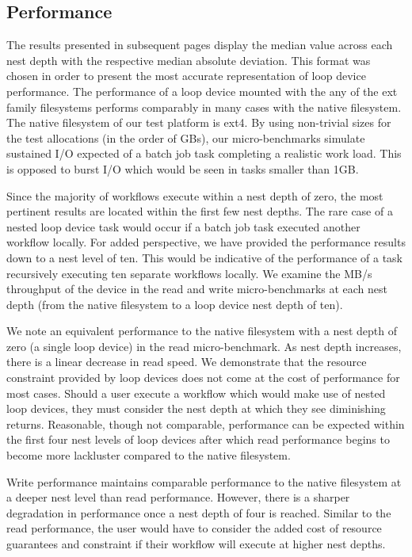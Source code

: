 \documentclass[conference]{IEEEtran}
\begin{document}
\subsection{Performance}
The results presented in subsequent pages display the median value across each nest depth with the respective median absolute deviation. This format was chosen in order to present the most accurate representation of loop device performance. The performance of a loop device mounted with the any of the ext family filesystems performs comparably in many cases with the native filesystem. The native filesystem of our test platform is ext4. By using non-trivial sizes for the test allocations (in the order of GBs), our micro-benchmarks simulate sustained I/O expected of a batch job task completing a realistic work load. This is opposed to burst I/O which would be seen in tasks smaller than 1GB. 

Since the majority of workflows execute within a nest depth of zero, the most pertinent results are located within the first few nest depths. The rare case of a nested loop device task would occur if a batch job task executed another workflow locally. For added perspective, we have provided the performance results down to a nest level of ten. This would be indicative of the performance of a task recursively executing ten separate workflows locally. 
We examine the MB/s throughput of the device in the read and write micro-benchmarks at each nest depth (from the native filesystem to a loop device nest depth of ten).

 We note an equivalent performance to the native filesystem with a nest depth of zero (a single loop device) in the read micro-benchmark. As nest depth increases, there is a linear decrease in read speed. We demonstrate that the resource constraint provided by loop devices does not come at the cost of performance for most cases. Should a user execute a workflow which would make use of nested loop devices, they must consider the nest depth at which they see diminishing returns. Reasonable, though not comparable, performance can be expected within the first four nest levels of loop devices after which read performance begins to become more lackluster compared to the native filesystem.

Write performance maintains comparable performance to the native filesystem at a deeper nest level than read performance. However, there is a sharper degradation in performance once a nest depth of four is reached. Similar to the read performance, the user would have to consider the added cost of resource guarantees and constraint if their workflow will execute at higher nest depths. 
\end{document}
